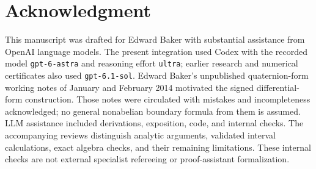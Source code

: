 \documentclass[11pt]{article}
\numberwithin{equation}{section}
\theoremstyle{definition}
\theoremstyle{remark}
\begin{document}
\section*{Acknowledgment}
This manuscript was drafted for Edward Baker with substantial assistance
from OpenAI language models. The present integration used Codex with the
recorded model \texttt{gpt-6-astra} and reasoning effort \texttt{ultra};
earlier research and numerical certificates also used
\texttt{gpt-6.1-sol}. Edward Baker's unpublished quaternion-form working
notes of January and February 2014 motivated the signed differential-form
construction. Those notes were circulated with mistakes and incompleteness
acknowledged; no general nonabelian boundary formula from them is assumed. LLM assistance included derivations, exposition,
code, and internal checks. The accompanying reviews distinguish
analytic arguments, validated interval calculations, exact algebra
checks, and their remaining limitations. These internal checks are not
external specialist refereeing or proof-assistant formalization.
\end{document}
